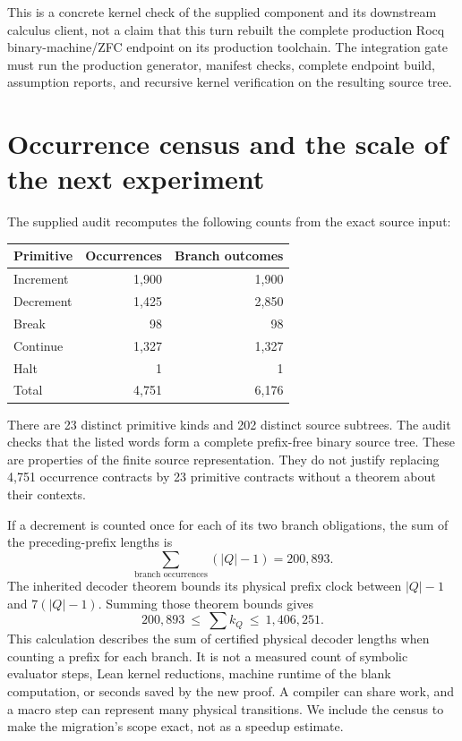 \documentclass[11pt,letterpaper]{article}
\theoremstyle{definition}\newtheorem{definition}[theorem]{Definition}
\theoremstyle{remark}\newtheorem{remark}[theorem]{Remark}
\begin{document}
This is a concrete kernel check of the supplied component and its downstream calculus client, not a claim that this turn rebuilt the complete production Rocq binary-machine/ZFC endpoint on its production toolchain. The integration gate must run the production generator, manifest checks, complete endpoint build, assumption reports, and recursive kernel verification on the resulting source tree.

\section{Occurrence census and the scale of the next experiment}

The supplied audit recomputes the following counts from the exact source input:

\begin{tabularx}{\textwidth}{@{}Yrr@{}}
\toprule
Primitive & Occurrences & Branch outcomes\\
\midrule
Increment & 1,900 & 1,900\\
Decrement & 1,425 & 2,850\\
Break & 98 & 98\\
Continue & 1,327 & 1,327\\
Halt & 1 & 1\\
\midrule
Total & 4,751 & 6,176\\
\bottomrule
\end{tabularx}

There are 23 distinct primitive kinds and 202 distinct source subtrees. The audit checks that the listed words form a complete prefix-free binary source tree. These are properties of the finite source representation. They do not justify replacing 4,751 occurrence contracts by 23 primitive contracts without a theorem about their contexts.

If a decrement is counted once for each of its two branch obligations, the sum of the preceding-prefix lengths is
\[
\sum_{\text{branch occurrences}}(|Q|-1)=200{,}893.
\]
The inherited decoder theorem bounds its physical prefix clock between $|Q|-1$ and $7(|Q|-1)$. Summing those theorem bounds gives
\[
200{,}893\ \leq\ \sum k_Q\ \leq\ 1{,}406{,}251.
\]
This calculation describes the sum of certified physical decoder lengths when counting a prefix for each branch. It is not a measured count of symbolic evaluator steps, Lean kernel reductions, machine runtime of the blank computation, or seconds saved by the new proof. A compiler can share work, and a macro step can represent many physical transitions. We include the census to make the migration's scope exact, not as a speedup estimate.
\end{document}
